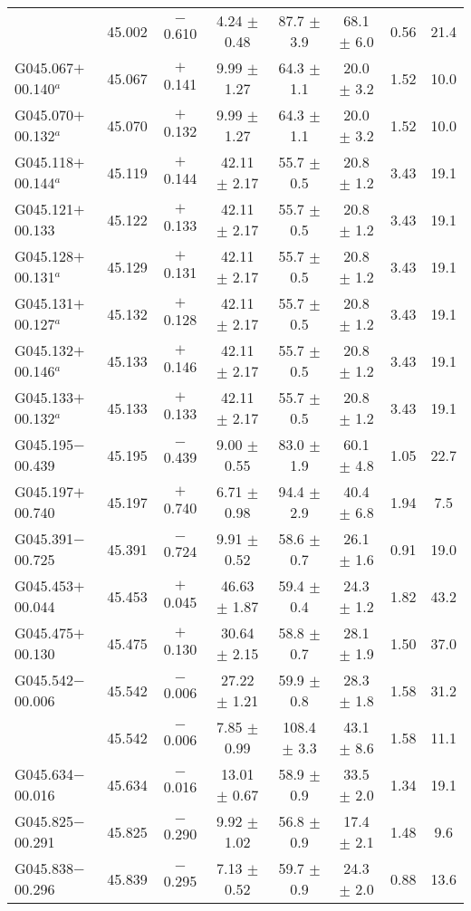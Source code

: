 \begin{ThreePartTable}
\begin{longtable}{lccccccc}
                      &45.002&	$-$0.610	&4.24	$\pm$ 0.48	&87.7	$\pm$ 3.9	&68.1	$\pm$ 6.0	&0.56	&21.4\\
G045.067$+$00.140$^a$ &45.067&	$+$0.141	&9.99	$\pm$ 1.27	&64.3	$\pm$ 1.1	&20.0	$\pm$ 3.2	&1.52	&10.0\\
G045.070$+$00.132$^a$ &45.070&	$+$0.132	&9.99	$\pm$ 1.27	&64.3	$\pm$ 1.1	&20.0	$\pm$ 3.2	&1.52	&10.0\\
G045.118$+$00.144$^a$ &45.119&	$+$0.144	&42.11	$\pm$ 2.17	&55.7	$\pm$ 0.5	&20.8	$\pm$ 1.2	&3.43	&19.1\\
G045.121$+$00.133     &45.122&	$+$0.133	&42.11	$\pm$ 2.17	&55.7	$\pm$ 0.5	&20.8	$\pm$ 1.2	&3.43	&19.1\\
G045.128$+$00.131$^a$ &45.129&	$+$0.131	&42.11	$\pm$ 2.17	&55.7	$\pm$ 0.5	&20.8	$\pm$ 1.2	&3.43	&19.1\\
G045.131$+$00.127$^a$ &45.132&	$+$0.128	&42.11	$\pm$ 2.17	&55.7	$\pm$ 0.5	&20.8	$\pm$ 1.2	&3.43	&19.1\\
G045.132$+$00.146$^a$ &45.133&	$+$0.146	&42.11	$\pm$ 2.17	&55.7	$\pm$ 0.5	&20.8	$\pm$ 1.2	&3.43	&19.1\\
G045.133$+$00.132$^a$ &45.133&	$+$0.133	&42.11	$\pm$ 2.17	&55.7	$\pm$ 0.5	&20.8	$\pm$ 1.2	&3.43	&19.1\\
G045.195$-$00.439     &45.195&	$-$0.439	&9.00	$\pm$ 0.55	&83.0	$\pm$ 1.9	&60.1	$\pm$ 4.8	&1.05	&22.7\\
G045.197$+$00.740     &45.197&	$+$0.740	&6.71	$\pm$ 0.98	&94.4	$\pm$ 2.9	&40.4	$\pm$ 6.8	&1.94	&7.5\\
G045.391$-$00.725     &45.391&	$-$0.724	&9.91	$\pm$ 0.52	&58.6	$\pm$ 0.7	&26.1	$\pm$ 1.6	&0.91	&19.0\\
G045.453$+$00.044     &45.453&	$+$0.045	&46.63	$\pm$ 1.87	&59.4	$\pm$ 0.4	&24.3	$\pm$ 1.2	&1.82	&43.2\\
G045.475$+$00.130     &45.475&	$+$0.130	&30.64	$\pm$ 2.15	&58.8	$\pm$ 0.7	&28.1	$\pm$ 1.9	&1.50	&37.0\\
G045.542$-$00.006     &45.542&	$-$0.006	&27.22	$\pm$ 1.21	&59.9	$\pm$ 0.8	&28.3	$\pm$ 1.8	&1.58	&31.2\\
                      &45.542&	$-$0.006	&7.85	$\pm$ 0.99	&108.4	$\pm$ 3.3	&43.1	$\pm$ 8.6	&1.58	&11.1\\
G045.634$-$00.016     &45.634&	$-$0.016	&13.01	$\pm$ 0.67	&58.9	$\pm$ 0.9	&33.5	$\pm$ 2.0	&1.34	&19.1\\
G045.825$-$00.291     &45.825&	$-$0.290	&9.92	$\pm$ 1.02	&56.8	$\pm$ 0.9	&17.4	$\pm$ 2.1	&1.48	&9.6\\
G045.838$-$00.296     &45.839&	$-$0.295	&7.13	$\pm$ 0.52	&59.7	$\pm$ 0.9	&24.3	$\pm$ 2.0	&0.88	&13.6\\

\end{longtable}
\end{ThreePartTable}
